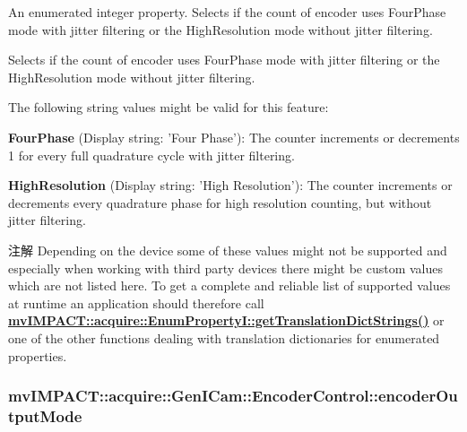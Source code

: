 An enumerated integer property. Selects if the count of encoder uses Four\+Phase mode with jitter filtering or the High\+Resolution mode without jitter filtering. 

Selects if the count of encoder uses Four\+Phase mode with jitter filtering or the High\+Resolution mode without jitter filtering.

The following string values might be valid for this feature\+:
\begin{DoxyItemize}
\item {\bfseries Four\+Phase} (Display string\+: 'Four Phase')\+: The counter increments or decrements 1 for every full quadrature cycle with jitter filtering.
\item {\bfseries High\+Resolution} (Display string\+: 'High Resolution')\+: The counter increments or decrements every quadrature phase for high resolution counting, but without jitter filtering.
\end{DoxyItemize}

\begin{DoxyNote}{注解}
Depending on the device some of these values might not be supported and especially when working with third party devices there might be custom values which are not listed here. To get a complete and reliable list of supported values at runtime an application should therefore call {\bfseries \hyperlink{classmv_i_m_p_a_c_t_1_1acquire_1_1_enum_property_i_a0ba6ccbf5ee69784d5d0b537924d26b6}{mv\+I\+M\+P\+A\+C\+T\+::acquire\+::\+Enum\+Property\+I\+::get\+Translation\+Dict\+Strings()}} or one of the other functions dealing with translation dictionaries for enumerated properties. 
\end{DoxyNote}
\hypertarget{classmv_i_m_p_a_c_t_1_1acquire_1_1_gen_i_cam_1_1_encoder_control_a7a40405d4f56f2631eaba4f26edca5f5}{
\subsubsection[{encoder\+Output\+Mode}]{ mv\+I\+M\+P\+A\+C\+T\+::acquire\+::\+Gen\+I\+Cam\+::\+Encoder\+Control\+::encoder\+Output\+Mode}}\label{classmv_i_m_p_a_c_t_1_1acquire_1_1_gen_i_cam_1_1_encoder_control_a7a40405d4f56f2631eaba4f26edca5f5}


